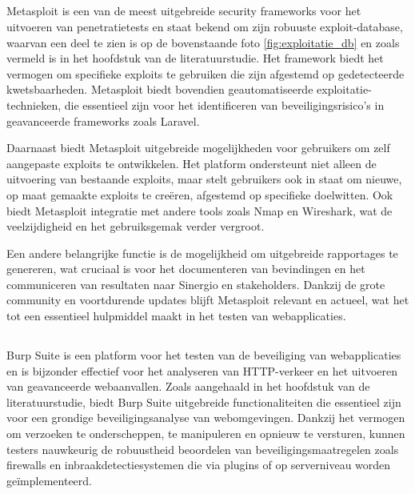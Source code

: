 \subsection{}
Metasploit is een van de meest uitgebreide security frameworks voor het uitvoeren van penetratietests en staat bekend om 
zijn robuuste exploit-database, waarvan een deel te zien is op de bovenstaande foto \ref{fig:exploitatie_db} en zoals vermeld is in het hoofdstuk  van de 
literatuurstudie. Het framework biedt het vermogen om specifieke exploits te gebruiken die zijn afgestemd op gedetecteerde 
kwetsbaarheden. Metasploit biedt bovendien geautomatiseerde exploitatie-technieken, die essentieel zijn voor het identificeren 
van beveiligingsrisico's in geavanceerde frameworks zoals Laravel. 

Daarnaast biedt Metasploit uitgebreide mogelijkheden voor gebruikers om zelf aangepaste exploits te ontwikkelen. Het platform 
ondersteunt niet alleen de uitvoering van bestaande exploits, maar stelt gebruikers ook in staat om nieuwe, op maat gemaakte 
exploits te creëren, afgestemd op specifieke doelwitten. Ook biedt Metasploit integratie met andere 
tools zoals Nmap en Wireshark, wat de veelzijdigheid en het gebruiksgemak verder vergroot. 

Een andere belangrijke functie is de mogelijkheid om uitgebreide rapportages te genereren, 
wat cruciaal is voor het documenteren van bevindingen en het communiceren van resultaten naar Sinergio en stakeholders. Dankzij de grote 
community en voortdurende updates blijft Metasploit relevant en actueel, wat het tot een essentieel hulpmiddel maakt in het 
testen van webapplicaties.

\subsection{}
Burp Suite is een platform voor het testen van de beveiliging van webapplicaties en is bijzonder effectief voor 
het analyseren van HTTP-verkeer en het uitvoeren van geavanceerde webaanvallen. Zoals aangehaald in het hoofdstuk  
van de literatuurstudie, biedt Burp Suite uitgebreide functionaliteiten die essentieel zijn voor een grondige beveiligingsanalyse 
van webomgevingen. Dankzij het vermogen om verzoeken te onderscheppen, te manipuleren en opnieuw te versturen, kunnen 
testers nauwkeurig de robuustheid beoordelen van beveiligingsmaatregelen zoals firewalls en inbraakdetectiesystemen die via 
plugins of op serverniveau worden geïmplementeerd. 


